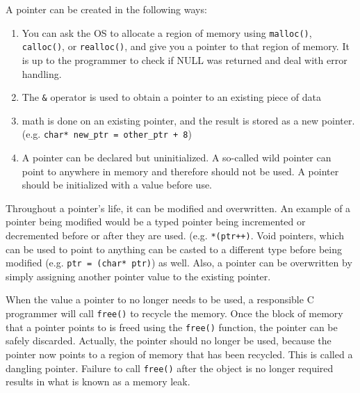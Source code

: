 A pointer can be created in the following ways:
\begin{enumerate}
  \item You can ask the OS to allocate a region of
    memory using \texttt{malloc()}, \texttt{calloc()}, or \texttt{realloc()},
    and give you a pointer to that region of memory. It is up to the programmer
    to check if NULL was returned and deal with error handling.
  \item The \texttt{\&} operator is used to obtain a pointer to an existing
    piece of data
  \item math is done on an existing pointer, and the result is stored as a new
    pointer. (e.g. \texttt{char* new\_ptr = other\_ptr + 8})
  \item A pointer can be declared but uninitialized. A so-called wild pointer
    can point to anywhere in memory and therefore should not be used. A pointer
    should be initialized with a value before use.
\end{enumerate}

Throughout a pointer's life, it can be modified and overwritten. An example of a
pointer being modified would be a typed pointer being incremented or decremented
before or after they are used. (e.g. \texttt{*(ptr++)}.  Void pointers, which
can be used to point to anything can be casted to a different type before being
modified (e.g. \texttt{ptr = (char* ptr)}) as well. Also, a pointer can be
overwritten by simply assigning another pointer value to the existing pointer.

When the value a pointer to no longer needs to be used, a responsible C
programmer will call \texttt{free()} to recycle the memory.
Once the block of memory that a pointer points to is freed using the
\texttt{free()} function, the pointer can be safely discarded. Actually, the
pointer should no longer be used, because the pointer now points to a region of
memory that has been recycled. This is called a dangling pointer. Failure to
call \texttt{free()} after the object is no longer required results in what is
known as a memory leak.

